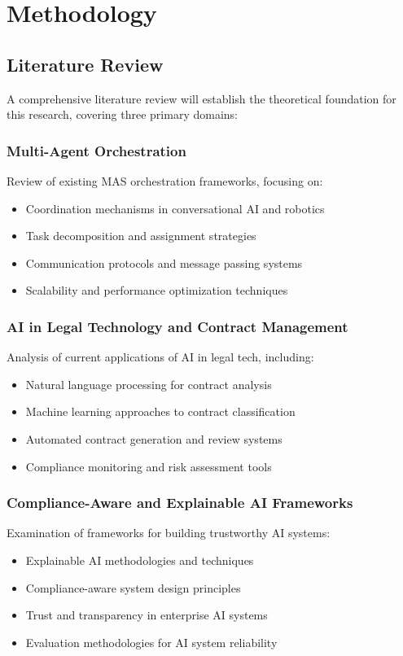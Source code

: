
\chapter{Methodology}\label{chapter:methodology}

\section{Literature Review}

A comprehensive literature review will establish the theoretical foundation for this research, covering three primary domains:

\subsection{Multi-Agent Orchestration}
Review of existing MAS orchestration frameworks, focusing on:
\begin{itemize}
    \item Coordination mechanisms in conversational AI and robotics
    \item Task decomposition and assignment strategies
    \item Communication protocols and message passing systems
    \item Scalability and performance optimization techniques
\end{itemize}

\subsection{AI in Legal Technology and Contract Management}
Analysis of current applications of AI in legal tech, including:
\begin{itemize}
    \item Natural language processing for contract analysis
    \item Machine learning approaches to contract classification
    \item Automated contract generation and review systems
    \item Compliance monitoring and risk assessment tools
\end{itemize}

\subsection{Compliance-Aware and Explainable AI Frameworks}
Examination of frameworks for building trustworthy AI systems:
\begin{itemize}
    \item Explainable AI methodologies and techniques
    \item Compliance-aware system design principles
    \item Trust and transparency in enterprise AI systems
    \item Evaluation methodologies for AI system reliability
\end{itemize}

